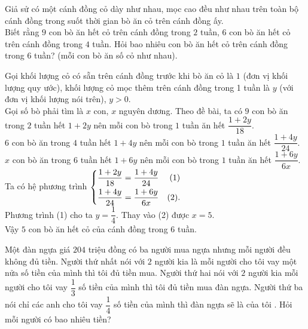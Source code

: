\begin{bt}
Giả sử có một cánh đồng cỏ dày như nhau, mọc cao đều như nhau trên toàn bộ cánh đồng trong suốt thời gian bò ăn cỏ trên cánh đồng ấy.\\
Biết rằng $ 9 $ con bò ăn hết cỏ trên cánh đồng trong $ 2 $ tuần, $ 6 $ con bò ăn hết cỏ trên cánh đồng trong $ 4 $ tuần. Hỏi bao nhiêu con bò ăn hết cỏ trên cánh đồng trong $ 6 $ tuần? (mỗi con bò ăn số cỏ như nhau).
	
	\loigiai
	{
	Gọi khối lượng cỏ có sẵn trên cánh đồng trước khi bò ăn cỏ là $ 1 $ (đơn vị khối lượng quy ước), khối lượng cỏ mọc thêm trên cánh đồng trong 1 tuần là $ y $ (với đơn vị khối lượng nói trên), $ y>0 $.\\
	Gọi số bò phải tìm là $ x $ con, $ x $ nguyên dương. Theo đề bài, ta có
	$ 9 $ con bò ăn trong $ 2 $ tuần hết $ 1+2y $ nên mỗi con bò trong $ 1 $ tuần ăn hết $ \dfrac{1+2y}{18} $.\\
	$ 6 $ con bò ăn trong $ 4 $ tuần hết $ 1+4y $ nên mỗi con bò trong $ 1 $ tuần ăn hết $ \dfrac{1+4y}{24} $.\\
	$ x $ con bò ăn trong $ 6 $ tuần hết $ 1+6y $ nên mỗi con bò trong $ 1 $ tuần ăn hết $ \dfrac{1+6y}{6x} $.\\
	Ta có hệ phương trình $ \left\{\begin{aligned}&\dfrac{1+2y}{18}=\dfrac{1+4y}{24}&(1)\\&\dfrac{1+4y}{24}=\dfrac{1+6y}{6x}&(2).\end{aligned}\right. $\\
	Phương trình (1) cho ta $ y=\dfrac{1}{4} $. Thay vào (2)
được $ x=5 $.\\
Vậy $ 5 $ con bò ăn hết cỏ của cánh đồng trong $ 6 $ tuần.	}
\end{bt}

\begin{bt}
	Một đàn ngựa giá $204$ triệu đồng có ba người mua ngựa nhưng mỗi người đều không đủ tiền. 
	Người thứ nhất nói với $2$  người kia là mỗi người cho tôi vay một nửa số tiền của mình thì tôi đủ tiền mua. Người thứ hai nói với $2$ người kia mỗi người cho tôi vay $\dfrac{1}{3}$ số tiền của mình thì tôi đủ tiền mua đàn ngựa. Người thứ ba nói chỉ các anh cho tôi vay $\dfrac{1}{4}$ số tiền của mình thì đàn ngựa sẽ là của tôi . Hỏi mỗi người có bao nhiêu tiền?
\end{bt}


